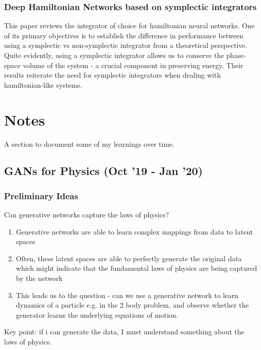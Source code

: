 \documentclass{article}
\begin{document}
\subsubsection{Deep Hamiltonian Networks based on symplectic integrators}

This paper \cite{zhu_deep_2020} reviews the integrator of choice for hamiltonian neural networks. One of its primary objectives is to establish the difference in performance between using a symplectic vs non-symplectic integrator from a theoretical perspective. Quite evidently, using a symplectic integrator allows us to conserve the phase-space volume of the system - a crucial component in preserving energy. Their results reiterate the need for symplectic integrators when dealing with hamiltonian-like systems.



\section{Notes}

A section to document some of my learnings over time.

\subsection{GANs for Physics (Oct '19 - Jan '20)}

\subsubsection*{Preliminary Ideas}

Can generative networks capture the laws of physics?

\begin{enumerate}
\item Generative networks are able to learn complex mappings from data to latent spaces
\item Often, these latent spaces are able to perfectly generate the original data which might indicate that the fundamental laws of physics are being captured by the network
\item This leads us to the question - can we use a generative network to learn dynamics of a particle e.g. in the 2 body problem, and observe whether the generator learns the underlying equations of motion.
\end{enumerate}
Key point: if i can generate the data, I must understand something about the laws of physics.
\end{document}
